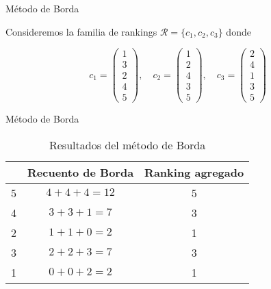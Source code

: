 \documentclass[10pt]{beamer}
\begin{document}
	\begin{frame}{Método de Borda}
		
		\begin{ejemplo}
			Consideremos la familia de rankings $\mathcal{R} = \{c_1, c_2, c_3\}$ donde
			
			\begin{equation*}
			c_1 = \left( \begin{array}{c}
			1\\
			3\\
			2\\
			4\\
			5
			\end{array} \right), \quad
			c_2 = \left( \begin{array}{c}
			1\\
			2\\
			4\\
			3\\
			5
			\end{array} \right), \quad
			c_3 = \left( \begin{array}{c}
			2\\
			4\\
			1\\
			3\\
			5
			\end{array} \right)
			\end{equation*}
			 
		\end{ejemplo}
	
		
	\end{frame}
	
	\begin{frame}{Método de Borda}
		\begin{ejemplo}[continuación]
			
			\begin{table}[h]
				\centering
				\caption{Resultados del método de Borda}
				\label{tbl:borda_resultados}

				\begin{tabular}{@{}ccc@{}}
					\cmidrule(l){2-3}
					& Recuento de Borda & Ranking agregado \\ \midrule
					5 & $4 + 4 + 4 = 12$       & 5       \\
					4 & $3 + 3 + 1 =  7$       & 3       \\
					2 & $1 + 1 + 0 =  2$       & 1       \\
					3 & $2 + 2 + 3 =  7$       & 3       \\
					1 & $0 + 0 + 2 =  2$       & 1       \\ \bottomrule
				\end{tabular}

			\end{table}
			
		\end{ejemplo}
	\end{frame}
	
\end{document}

